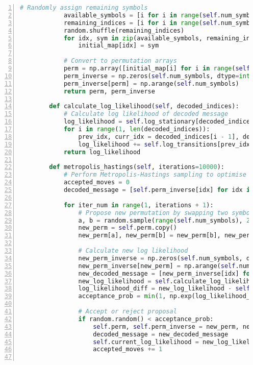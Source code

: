 \documentclass{article}
\begin{document}
\begin{enumerate}
\begin{lstlisting}[language=Python, numbers=left, frame=single, breaklines=true, basicstyle=\small]
            # Randomly assign remaining symbols
            available_symbols = [i for i in range(self.num_symbols) if i not in initial_map]
            remaining_indices = [i for i in range(self.num_symbols) if i not in initial_map.values()]
            random.shuffle(remaining_indices)
            for idx, sym in zip(available_symbols, remaining_indices):
                initial_map[idx] = sym
    
            # Convert to permutation arrays
            perm = np.array([initial_map[i] for i in range(self.num_symbols)])
            perm_inverse = np.zeros(self.num_symbols, dtype=int)
            perm_inverse[perm] = np.arange(self.num_symbols)
            return perm, perm_inverse
    
        def calculate_log_likelihood(self, decoded_indices):
            # Calculate log likelihood of decoded message
            log_likelihood = self.log_stationary[decoded_indices[0]]
            for i in range(1, len(decoded_indices)):
                prev_idx, curr_idx = decoded_indices[i - 1], decoded_indices[i]
                log_likelihood += self.log_transitions[prev_idx, curr_idx]
            return log_likelihood
    
        def metropolis_hastings(self, iterations=10000):
            # Perform Metropolis-Hastings sampling to optimise permutation
            accepted_moves = 0
            decoded_message = [self.perm_inverse[idx] for idx in self.encrypted_indices]
    
            for iter_num in range(1, iterations + 1):
                # Propose new permutation by swapping two symbols
                a, b = random.sample(range(self.num_symbols), 2)
                new_perm = self.perm.copy()
                new_perm[a], new_perm[b] = new_perm[b], new_perm[a]
    
                # Calculate new log likelihood
                new_perm_inverse = np.zeros(self.num_symbols, dtype=int)
                new_perm_inverse[new_perm] = np.arange(self.num_symbols)
                new_decoded_message = [new_perm_inverse[idx] for idx in self.encrypted_indices]
                new_log_likelihood = self.calculate_log_likelihood(new_decoded_message)
                log_likelihood_diff = new_log_likelihood - self.current_log_likelihood
                acceptance_prob = min(1, np.exp(log_likelihood_diff))
    
                # Accept or reject proposal
                if random.random() < acceptance_prob:
                    self.perm, self.perm_inverse = new_perm, new_perm_inverse
                    decoded_message = new_decoded_message
                    self.current_log_likelihood = new_log_likelihood
                    accepted_moves += 1
    

\end{lstlisting}
\end{enumerate}
\end{document}
